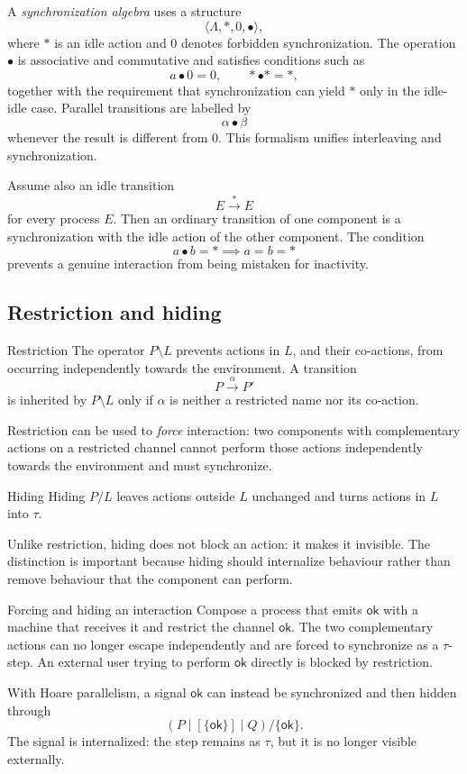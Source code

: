 \documentclass[a4paper]{article}
\newcommand{\trans}[1]{\xrightarrow{#1}}
\begin{document}
A \emph{synchronization algebra} uses a structure
\[
    \langle\Lambda,*,0,\bullet\rangle,
\]
where \(*\) is an idle action and \(0\) denotes forbidden synchronization.
The operation \(\bullet\) is associative and commutative and satisfies conditions such as
\[
    a\bullet0=0,
    \qquad
    *\bullet*=*,
\]
together with the requirement that synchronization can yield \(*\) only in the idle-idle case.
Parallel transitions are labelled by
\[
    \alpha\bullet\beta
\]
whenever the result is different from \(0\).
This formalism unifies interleaving and synchronization.

Assume also an idle transition
\[
    E\trans{*}E
\]
for every process \(E\).
Then an ordinary transition of one component is a synchronization with the idle action of the other component.
The condition
\[
    a\bullet b=*
    \implies
    a=b=*
\]
prevents a genuine interaction from being mistaken for inactivity.

\subsection{Restriction and hiding}

\begin{snippetdefinition}{Restriction}
    The operator \(P\setminus L\) prevents actions in \(L\), and their co-actions, from occurring independently towards the environment.
    A transition
    \[
        P\trans{\alpha}P'
    \]
    is inherited by \(P\setminus L\) only if \(\alpha\) is neither a restricted name nor its co-action.
\end{snippetdefinition}

Restriction can be used to \emph{force} interaction: two components with complementary actions on a restricted channel cannot perform those actions independently towards the environment and must synchronize.

\begin{snippetdefinition}{Hiding}
    Hiding \(P/L\) leaves actions outside \(L\) unchanged and turns actions in \(L\) into \(\tau\).
\end{snippetdefinition}

Unlike restriction, hiding does not block an action: it makes it invisible.
The distinction is important because hiding should internalize behaviour rather than remove behaviour that the component can perform.

\begin{snippetexample}{Forcing and hiding an interaction}
    Compose a process that emits \(\mathsf{ok}\) with a machine that receives it and restrict the channel \(\mathsf{ok}\).
    The two complementary actions can no longer escape independently and are forced to synchronize as a \(\tau\)-step.
    An external user trying to perform \(\mathsf{ok}\) directly is blocked by restriction.

    With Hoare parallelism, a signal \(\mathsf{ok}\) can instead be synchronized and then hidden through
    \[
        (P\mid[\{\mathsf{ok}\}]\mid Q)/\{\mathsf{ok}\}.
    \]
    The signal is internalized: the step remains as \(\tau\), but it is no longer visible externally.
\end{snippetexample}
\end{document}
